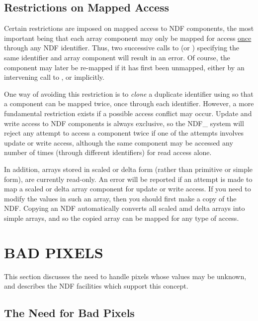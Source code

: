 \documentclass[twoside,11pt,nolof]{starlink}
\providecommand{\st}[1]{{\emph{#1}}}
\begin{document}
\subsection{\label{ss:restrictionsonmapping}Restrictions on Mapped Access}

Certain restrictions are imposed on mapped access to NDF components, the
most important being that each array component may only be mapped for access
\underline{once} through any NDF identifier.
Thus, two successive calls to  (or ) specifying the same
identifier and array component will result in an error.
Of course, the component may later be re-mapped if it has first been
unmapped, either by an intervening call to , or implicitly.

One way of avoiding this restriction is to \st{clone\/} a duplicate identifier
using  so that a component can be mapped twice, once through each
identifier.
However, a more fundamental restriction exists if a possible access conflict may
occur.
Update and write access to NDF components is always exclusive, so the NDF\_
system will reject any attempt to access a component twice if one of the
attempts involves update or write access, although the same component may be
accessed any number of times (through different identifiers) for read access
alone.

In addition, arrays stored in scaled or delta form (rather than primitive
or simple form), are currently read-only. An error will be reported if an
attempt is made to map a scaled or delta array component for update or write
access.
If you need to modify the values in such an array, then you should first
make a copy of the NDF. Copying an NDF automatically converts all scaled
amd delta arrays into simple arrays, and so the copied array can be mapped
for any type of access.

\section{\label{ss:badpixels}BAD PIXELS}

This section discusses the need to handle pixels whose values may be
unknown, and describes the NDF facilities which support this concept.

\subsection{The Need for Bad Pixels}
\end{document}
